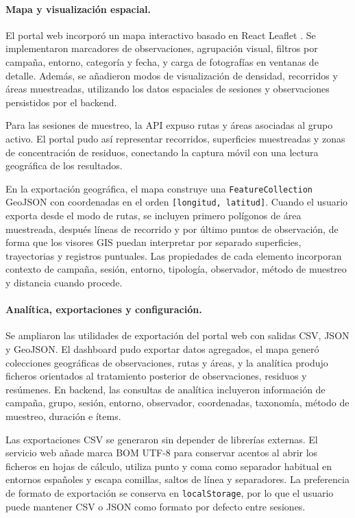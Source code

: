 \paragraph{Mapa y visualización espacial.}
El portal web incorporó un mapa interactivo basado en React Leaflet \cite{reactleaflet}. Se
implementaron marcadores de observaciones, agrupación visual, filtros por
campaña, entorno, categoría y fecha, y carga de fotografías en ventanas de
detalle. Además, se añadieron modos de visualización de densidad, recorridos y
áreas muestreadas, utilizando los datos espaciales de sesiones y observaciones
persistidos por el backend.

Para las sesiones de muestreo, la API expuso rutas y áreas asociadas al grupo
activo. El portal pudo así representar recorridos, superficies muestreadas y
zonas de concentración de residuos, conectando la captura móvil con una lectura
geográfica de los resultados.

En la exportación geográfica, el mapa construye una
\texttt{FeatureCollection} GeoJSON con coordenadas en el orden
\texttt{[longitud, latitud]}. Cuando el usuario exporta desde el modo de rutas,
se incluyen primero polígonos de área muestreada, después líneas de recorrido y
por último puntos de observación, de forma que los visores GIS puedan interpretar
por separado superficies, trayectorias y registros puntuales. Las propiedades de
cada elemento incorporan contexto de campaña, sesión, entorno, tipología,
observador, método de muestreo y distancia cuando procede.

\paragraph{Analítica, exportaciones y configuración.}
Se ampliaron las utilidades de exportación del portal web con salidas CSV, JSON
y GeoJSON. El dashboard pudo exportar datos agregados, el mapa generó
colecciones geográficas de observaciones, rutas y áreas, y la analítica produjo
ficheros orientados al tratamiento posterior de observaciones, residuos y
resúmenes. En backend, las consultas de analítica incluyeron información de
campaña, grupo, sesión, entorno, observador, coordenadas, taxonomía, método de
muestreo, duración e ítems.

Las exportaciones CSV se generaron sin depender de librerías externas. El
servicio web añade marca BOM UTF-8 para conservar acentos al abrir los ficheros
en hojas de cálculo, utiliza punto y coma como separador habitual en entornos
españoles y escapa comillas, saltos de línea y separadores. La preferencia de
formato de exportación se conserva en \texttt{localStorage}, por lo que el
usuario puede mantener CSV o JSON como formato por defecto entre sesiones.

